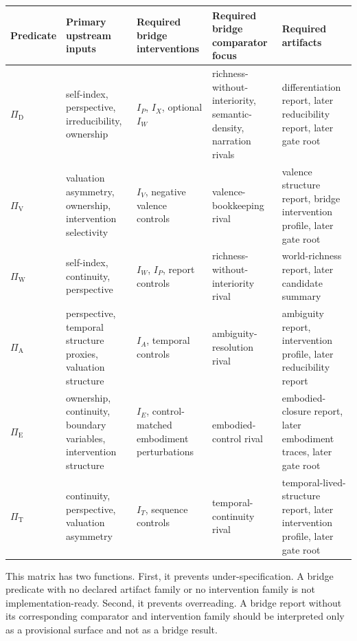 \documentclass[11pt,a4paper]{article}
\theoremstyle{definition}
\newcommand{\PiD}{\Pi_{\mathrm{D}}}
\newcommand{\PiV}{\Pi_{\mathrm{V}}}
\newcommand{\PiW}{\Pi_{\mathrm{W}}}
\newcommand{\PiA}{\Pi_{\mathrm{A}}}
\newcommand{\PiE}{\Pi_{\mathrm{E}}}
\newcommand{\PiT}{\Pi_{\mathrm{T}}}
\begin{document}
\begin{center}
\small
\begin{tabularx}{\linewidth}{@{}>{\raggedright\arraybackslash}p{}>{\raggedright\arraybackslash}p{}>{\raggedright\arraybackslash}p{}>{\raggedright\arraybackslash}p{}>{\raggedright\arraybackslash}p{}@{}}
\toprule
Predicate & Primary upstream inputs & Required bridge interventions & Required bridge comparator focus & Required artifacts \\
\midrule
$\PiD$ & self-index, perspective, irreducibility, ownership & $I_P$, $I_X$, optional $I_W$ & richness-without-interiority, semantic-density, narration rivals & differentiation report, later reducibility report, later gate root \\
$\PiV$ & valuation asymmetry, ownership, intervention selectivity & $I_V$, negative valence controls & valence-bookkeeping rival & valence structure report, bridge intervention profile, later gate root \\
$\PiW$ & self-index, continuity, perspective & $I_W$, $I_P$, report controls & richness-without-interiority rival & world-richness report, later candidate summary \\
$\PiA$ & perspective, temporal structure proxies, valuation structure & $I_A$, temporal controls & ambiguity-resolution rival & ambiguity report, intervention profile, later reducibility report \\
$\PiE$ & ownership, continuity, boundary variables, intervention structure & $I_E$, control-matched embodiment perturbations & embodied-control rival & embodied-closure report, later embodiment traces, later gate root \\
$\PiT$ & continuity, perspective, valuation asymmetry & $I_T$, sequence controls & temporal-continuity rival & temporal-lived-structure report, later intervention profile, later gate root \\
\bottomrule
\end{tabularx}
\end{center}

This matrix has two functions. First, it prevents under-specification. A bridge predicate with no declared artifact family or no intervention family is not implementation-ready. Second, it prevents overreading. A bridge report without its corresponding comparator and intervention family should be interpreted only as a provisional surface and not as a bridge result.
\end{document}
